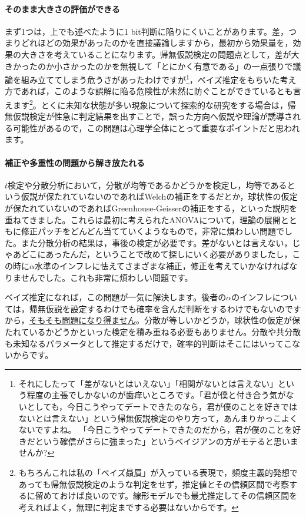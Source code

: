 \documentclass{ltjbook}
\begin{document}
\paragraph{そのまま大きさの評価ができる}
まず1つは，上でも述べたように1 bit判断に陥りにくいことがあります。差，つまりどれほどの効果があったのかを直接議論しますから，最初から効果量を，効果の大きさを考えていることになります。帰無仮説検定の問題点として，差が大きかったのか小さかったのかを無視して「とにかく有意である」の一点張りで議論を組み立ててしまう危うさがあったわけですが\footnote{それにしたって「差がないとはいえない」「相関がないとは言えない」という程度の主張でしかないのが歯痒いところです。「君が僕と付き合う気がないとしても，今日こうやってデートできたのなら，君が僕のことを好きではないとは言えない」という帰無仮説検定のやり方って，あんまりかっこよくないですよね。 「今日こうやってデートできたのだから，君が僕のことを好きだという確信がさらに強まった」というベイジアンの方がモテると思いませんか? }，ベイズ推定をもちいた考え方であれば，このような誤解に陥る危険性が未然に防ぐことができているとも言えます\footnote{もちろんこれは私の「ベイズ贔屓」が入っている表現で，頻度主義的発想であっても帰無仮説検定のような判定をせず，推定値とその信頼区間で考察するに留めておけば良いのです。線形モデルでも最尤推定してその信頼区間を考えればよく，無理に判定までする必要はないからです。}。とくに未知な状態が多い現象について探索的な研究をする場合は，帰無仮説検定が性急に判定結果を出すことで，誤った方向へ仮説や理論が誘導される可能性があるので，この問題は心理学全体にとって重要なポイントだと思われます。

\paragraph{補正や多重性の問題から解き放たれる}
$t$検定や分散分析において，分散が均等であるかどうかを検定し，均等であるという仮説が保たれていないのであればWelchの補正をするだとか，球状性の仮定が保たれていないのであればGreenhouse-Geisserの補正をする，といった説明を重ねてきました。これらは最初に考えられたANOVAについて，理論の展開とともに修正パッチをどんどん当てていくようなもので，非常に煩わしい問題でした。また分散分析の結果は，事後の検定が必要です。差がないとは言えない，じゃあどこにあったんだ，ということで改めて探しにいく必要がありましたし，この時に$\alpha$水準のインフレに怯えてさまざまな補正，修正を考えていかなければなりませんでした。これも非常に煩わしい問題です。

ベイズ推定になれば，この問題が一気に解決します。後者の$\alpha$のインフレについては，帰無仮説を設定するわけでも確率を含んだ判断をするわけでもないのですから，\underline{そもそも問題になり得ません}。分散が等しいかどうか，球状性の仮定が保たれているかどうかといった検定を積み重ねる必要もありません。分散や共分散も未知なるパラメータとして推定するだけで，確率的判断はそこにはいってこないからです。
\end{document}
